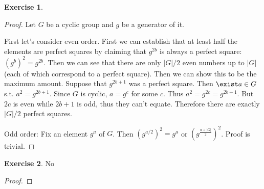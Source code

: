 \documentclass[11pt]{article}
\theoremstyle{definition}
\newtheorem{exercise}{{Exercise}}
\begin{document}
\begin{exercise}
	\begin{proof}
		Let $G$ be a cyclic group and $g$ be a generator of it.

		First let's consider even order. First we can establish that at least half the elements are perfect squares by claiming that $g^{2b}$ is always a perfect square: $(g^b)^2 = g^{2b}$. Then we can see that there are only $|G|/2$ even numbers up to $|G|$ (each of which correspond to a perfect square). Then we can show this to be the maximum amount. Suppose that $g^{2b+1}$ was a perfect square. Then $\exist a \in G$ s.t. $a^2 = g^{2b+1}$. Since $G$ is cyclic, $a = g^c$ for some $c$. Thus $a^2 = g^{2c} = g^{2b+1}$. But $2c$ is even while $2b+1$ is odd, thus they can't equate. Therefore there are exactly $|G|/2$ perfect squares.

		Odd order: Fix an element $g^a$ of $G$. Then $(g^{a/2})^2 = g^a$ or $\left(g^{\frac{a+|G|}{2}}\right)^2$. Proof is trivial.
	\end{proof}
\end{exercise}

\begin{exercise}
	No
\begin{proof}
	
\end{proof}
\end{exercise}
\end{document}
